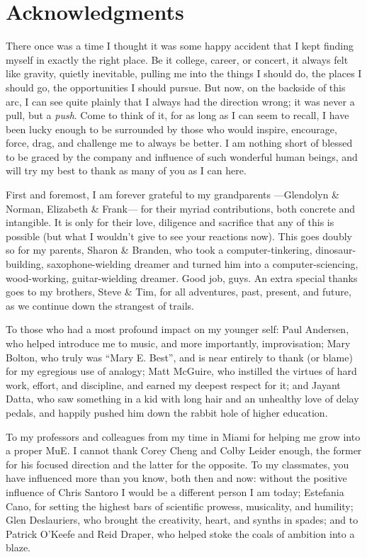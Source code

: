 
\chapter*{Acknowledgments}

There once was a time I thought it was some happy accident that I kept finding myself in exactly the right place.
Be it college, career, or concert, it always felt like gravity, quietly inevitable, pulling me into the things I should do, the places I should go, the opportunities I should pursue.
But now, on the backside of this arc, I can see quite plainly that I always had the direction wrong; it was never a pull, but a \emph{push}.
Come to think of it, for as long as I can seem to recall, I have been lucky enough to be surrounded by those who would inspire, encourage, force, drag, and challenge me to always be better.
I am nothing short of blessed to be graced by the company and influence of such wonderful human beings, and will try my best to thank as many of you as I can here.

First and foremost, I am forever grateful to my grandparents ---Glendolyn \& Norman, Elizabeth \& Frank--- for their myriad contributions, both concrete and intangible.
It is only for their love, diligence and sacrifice that any of this is possible (but what I wouldn't give to see your reactions now).
This goes doubly so for my parents, Sharon \& Branden, who took a computer-tinkering, dinosaur-building, saxophone-wielding dreamer and turned him into a computer-sciencing, wood-working, guitar-wielding dreamer.
Good job, guys.
An extra special thanks goes to my brothers, Steve \& Tim, for all adventures, past, present, and future, as we continue down the strangest of trails.

To those who had a most profound impact on my younger self:
Paul Andersen, who helped introduce me to music, and more importantly, improvisation;
Mary Bolton, who truly was ``Mary E. Best'', and is near entirely to thank (or blame) for my egregious use of analogy;
Matt McGuire, who instilled the virtues of hard work, effort, and discipline, and earned my deepest respect for it;
and Jayant Datta, who saw something in a kid with long hair and an unhealthy love of delay pedals, and happily pushed him down the rabbit hole of higher education.

To my professors and colleagues from my time in Miami for helping me grow into a proper MuE.
I cannot thank Corey Cheng and Colby Leider enough, the former for his focused direction and the latter for the opposite.
To my classmates, you have influenced more than you know, both then and now:
without the positive influence of Chris Santoro I would be a different person I am today;
Estefania Cano, for setting the highest bars of scientific prowess, musicality, and humility;
Glen Deslauriers, who brought the creativity, heart, and synths in spades;
and to Patrick O'Keefe and Reid Draper, who helped stoke the coals of ambition into a blaze.

